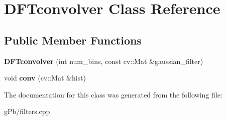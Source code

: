 \hypertarget{class_d_f_tconvolver}{\section{D\-F\-Tconvolver Class Reference}
\label{class_d_f_tconvolver}
}
\subsection*{Public Member Functions}
\begin{DoxyCompactItemize}
\item 
\hypertarget{class_d_f_tconvolver_a5506408610ddd0b0d47056404c88018a}{{\bfseries D\-F\-Tconvolver} (int num\-\_\-bins, const cv\-::\-Mat \&gaussian\-\_\-filter)}\label{class_d_f_tconvolver_a5506408610ddd0b0d47056404c88018a}

\item 
\hypertarget{class_d_f_tconvolver_adc03cd5d046d6599cfec85df627ef352}{void {\bfseries conv} (cv\-::\-Mat \&hist)}\label{class_d_f_tconvolver_adc03cd5d046d6599cfec85df627ef352}

\end{DoxyCompactItemize}


The documentation for this class was generated from the following file\-:\begin{DoxyCompactItemize}
\item 
g\-Pb/filters.\-cpp\end{DoxyCompactItemize}
